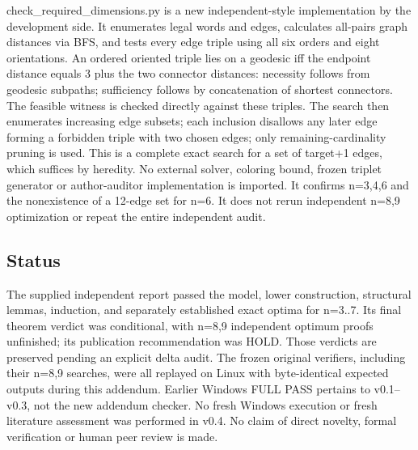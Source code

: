 \documentclass[
  10pt,
]{article}
\begin{document}
check\_required\_dimensions.py is a new independent-style implementation
by the development side. It enumerates legal words and edges, calculates
all-pairs graph distances via BFS, and tests every edge triple using all
six orders and eight orientations. An ordered oriented triple lies on a
geodesic iff the endpoint distance equals 3 plus the two connector
distances: necessity follows from geodesic subpaths; sufficiency follows
by concatenation of shortest connectors. The feasible witness is checked
directly against these triples. The search then enumerates increasing
edge subsets; each inclusion disallows any later edge forming a
forbidden triple with two chosen edges; only remaining-cardinality
pruning is used. This is a complete exact search for a set of target+1
edges, which suffices by heredity. No external solver, coloring bound,
frozen triplet generator or author-auditor implementation is imported.
It confirms n=3,4,6 and the nonexistence of a 12-edge set for n=6. It
does not rerun independent n=8,9 optimization or repeat the entire
independent audit.

\subsection{Status}\label{status}

The supplied independent report passed the model, lower construction,
structural lemmas, induction, and separately established exact optima
for n=3..7. Its final theorem verdict was conditional, with n=8,9
independent optimum proofs unfinished; its publication recommendation
was HOLD. Those verdicts are preserved pending an explicit delta audit.
The frozen original verifiers, including their n=8,9 searches, were all
replayed on Linux with byte-identical expected outputs during this
addendum. Earlier Windows FULL PASS pertains to v0.1--v0.3, not the new
addendum checker. No fresh Windows execution or fresh literature
assessment was performed in v0.4. No claim of direct novelty, formal
verification or human peer review is made.
\end{document}
